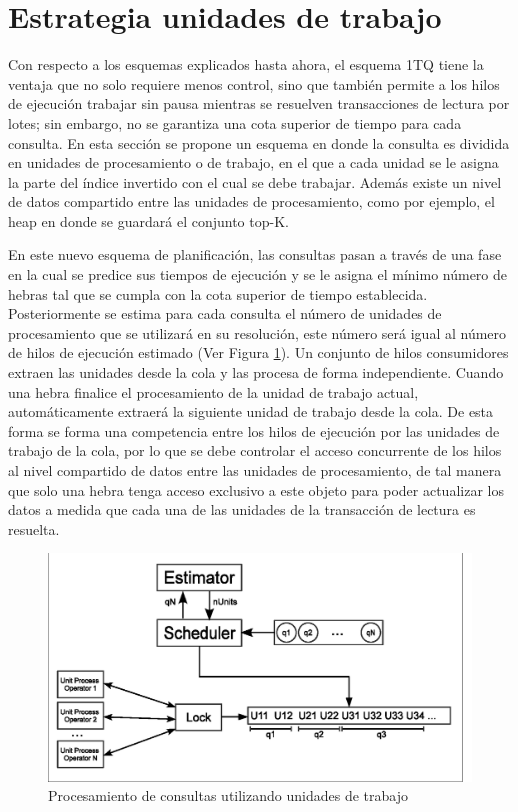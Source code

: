 \section{Estrategia unidades de trabajo}
\label{scheduling:unidadestrabajo}
Con respecto a los esquemas explicados hasta ahora, el esquema 1TQ tiene la ventaja que no solo requiere menos control, sino que también permite a los hilos de ejecución trabajar sin pausa mientras se resuelven transacciones de lectura por lotes; sin embargo, no se garantiza una cota superior de tiempo para cada consulta. En esta sección se propone un esquema en donde la consulta es dividida en unidades de procesamiento o de trabajo, en el que a cada unidad se le asigna la parte del índice invertido con el cual se debe trabajar. Además existe un nivel de datos compartido entre las unidades de procesamiento, como por ejemplo, el heap en donde se guardará el conjunto top-K.

En este nuevo esquema de planificación, las consultas pasan a través de una fase en la cual se predice sus tiempos de ejecución y se le asigna el mínimo número de hebras tal que se cumpla con la cota superior de tiempo establecida. Posteriormente se estima para cada consulta el número de unidades de procesamiento que se utilizará en su resolución, este número será igual al número de hilos de ejecución estimado (Ver Figura \ref{fig:unit_process}). Un conjunto de hilos consumidores extraen las unidades desde la cola y las procesa de forma independiente. Cuando una hebra finalice el procesamiento de la unidad de trabajo actual, automáticamente extraerá la siguiente unidad de trabajo desde la cola. De esta forma se forma una competencia entre los hilos de ejecución por las unidades de trabajo de la cola, por lo que se debe controlar el acceso concurrente de los hilos al nivel compartido de datos entre las unidades de procesamiento, de tal manera que solo una hebra tenga acceso exclusivo a este objeto para poder actualizar los datos a medida que cada una de las unidades de la transacción de lectura es resuelta.


\begin{figure}[!th]
\centering
\includegraphics[scale=.75]{images/unit_process.eps}
\caption{Procesamiento de consultas utilizando unidades de trabajo}
\label{fig:unit_process}
\end{figure}


